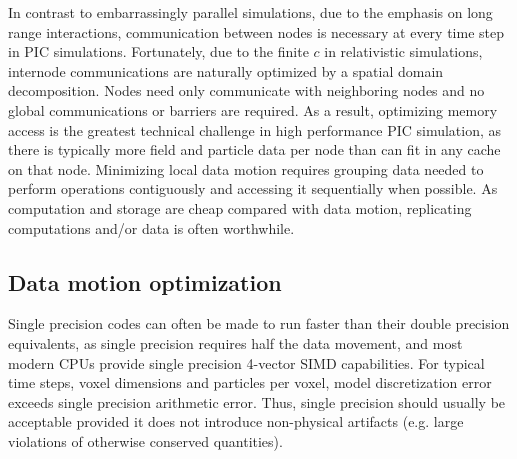 \documentclass[journal,twoside]{IEEEtran}
\begin{document}
In contrast to embarrassingly parallel simulations, due to the
emphasis on long range interactions, communication between nodes is
necessary at every time step in PIC simulations.  Fortunately, due to the
finite $c$ in relativistic simulations, internode communications are
naturally optimized by a spatial domain decomposition.  Nodes need
only communicate with neighboring nodes and no global communications
or barriers are required.  As a result, optimizing memory access is
the greatest technical challenge in high performance PIC simulation, as
there is typically more field and particle data per node than can fit
in any cache on that node.  Minimizing local data motion requires
grouping data needed to perform operations contiguously and accessing
it sequentially when possible.  As computation and storage are cheap
compared with data motion, replicating computations and/or data is
often worthwhile.

\subsection{Data motion optimization}

Single precision codes can often be made to run faster than their
double precision equivalents, as single precision requires half the
data movement, and most modern CPUs provide single precision 4-vector
SIMD capabilities.  For typical time steps, voxel dimensions and
particles per voxel, model discretization error exceeds single
precision arithmetic error.  Thus, single precision should usually be
acceptable provided it does not introduce non-physical artifacts
(e.g. large violations of otherwise conserved quantities).
\end{document}
